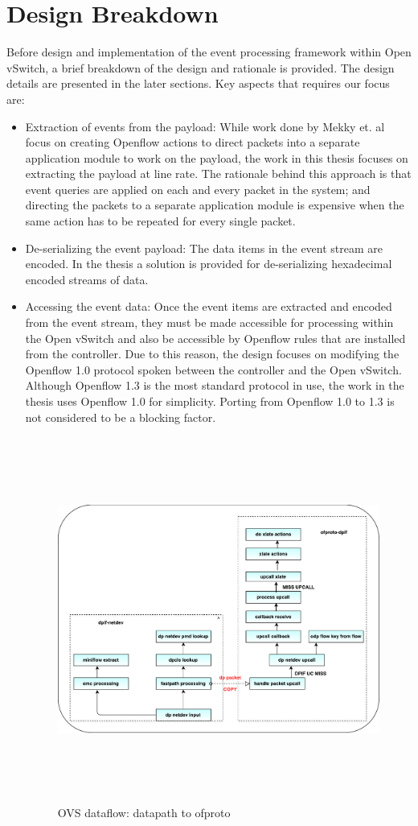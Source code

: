 \section{Design Breakdown}
Before design and implementation of the event processing framework within Open vSwitch, a brief breakdown of the design and rationale is provided. The design details are presented in the later sections. Key aspects that requires our focus are:
\begin{itemize}
	\item Extraction of events from the payload: While work done by  Mekky et. al \cite{mekky2014application} focus on creating Openflow actions to direct packets into a separate application module to work on the payload, the work in this thesis focuses on extracting the payload at line rate. The rationale behind this approach is that event queries are applied on each and every packet in the system; and directing the packets to a separate application module is expensive when the same action has to be repeated for every single packet.
	\item De-serializing the event payload: The data items in the event stream are encoded. In the thesis a solution is provided for de-serializing hexadecimal encoded streams of data. 
	\item Accessing the event data: Once the event items are extracted and encoded from the event stream, they must be made accessible for processing within the Open vSwitch and also be accessible by Openflow rules that are installed from the controller. Due to this reason, the design focuses on modifying the Openflow 1.0 protocol spoken between the controller and the Open vSwitch. Although Openflow 1.3 is the most standard protocol in use, the work in the thesis uses Openflow 1.0 for simplicity. Porting from Openflow 1.0 to 1.3 is not considered to be a blocking factor.
 \begin{figure}[H] 
	\centering   
	\caption{OVS dataflow: datapath to ofproto}
	\includegraphics[height=12cm]{dpnetdev.pdf}

\end{figure}
\end{itemize}
